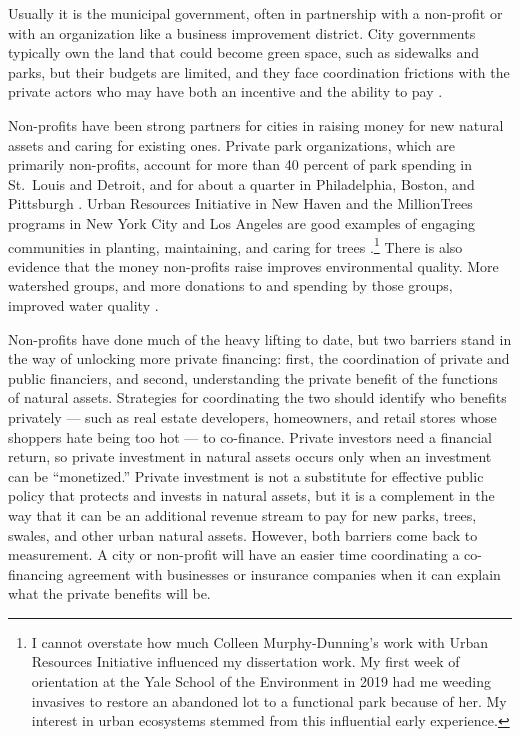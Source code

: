 \documentclass[12pt]{article}
\begin{document}
Usually it is the municipal government, often in partnership with a non-profit or with an organization like a business improvement district. City governments typically own the land that could become green space, such as sidewalks and parks, but their budgets are limited, and they face coordination frictions with the private actors who may have both an incentive and the ability to pay \citep{toxopeusReviewingFinancingBarriers2021}.

Non-profits have been strong partners for cities in raising money for new natural assets and caring for existing ones. Private park organizations, which are primarily non-profits, account for more than 40 percent of park spending in St.\ Louis and Detroit, and for about a quarter in Philadelphia, Boston, and Pittsburgh \citep{tplCityParkFacts2025}. Urban Resources Initiative in New Haven and the MillionTrees programs in New York City and Los Angeles are good examples of engaging communities in planting, maintaining, and caring for trees \citep{chenMoreExtremelyHot2024}.\footnote{I cannot overstate how much Colleen Murphy-Dunning's work with Urban Resources Initiative influenced my dissertation work. My first week of orientation at the Yale School of the Environment in 2019 had me weeding invasives to restore an abandoned lot to a functional park because of her. My interest in urban ecosystems stemmed from this influential early experience.} There is also evidence that the money non-profits raise improves environmental quality. More watershed groups, and more donations to and spending by those groups, improved water quality \citep{grantPrivateProvisionPublic2019}.

Non-profits have done much of the heavy lifting to date, but two barriers stand in the way of unlocking more private financing: first, the coordination of private and public financiers, and second, understanding the private benefit of the functions of natural assets. Strategies for coordinating the two should identify who benefits privately --- such as real estate developers, homeowners, and retail stores whose shoppers hate being too hot --- to co-finance. Private investors need a financial return, so private investment in natural assets occurs only when an investment can be ``monetized.'' Private investment is not a substitute for effective public policy that protects and invests in natural assets, but it is a complement in the way that it can be an additional revenue stream to pay for new parks, trees, swales, and other urban natural assets. However, both barriers come back to measurement. A city or non-profit will have an easier time coordinating a co-financing agreement with businesses or insurance companies when it can explain what the private benefits will be.
\end{document}
